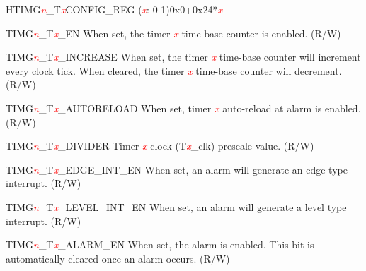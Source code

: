 \begin{register}{H}{TIMG\textcolor{red}{\it{n}}\_T\textcolor{red}{\it{x}}CONFIG\_REG (\textcolor{red}{\it{x}}: 0-1)}{0x0+0x24*\textcolor{red}{\it{x}}}\label{regdesc:TIMERSTnCONFIGREG}
%
%
%
%
%
%
%
%
\regnewline%
\begin{regdesc}\begin{reglist}
\item [TIMG\textcolor{red}{\it{n}}\_T\textcolor{red}{\it{x}}\_EN]When set, the timer \textcolor{red}{\it{x}} time-base counter is enabled. (R/W)
\item [TIMG\textcolor{red}{\it{n}}\_T\textcolor{red}{\it{x}}\_INCREASE]When set, the timer \textcolor{red}{\it{x}} time-base counter will increment every clock tick. When cleared, the timer \textcolor{red}{\it{x}} time-base counter will decrement. (R/W)
\item [TIMG\textcolor{red}{\it{n}}\_T\textcolor{red}{\it{x}}\_AUTORELOAD]When set, timer \textcolor{red}{\it{x}} auto-reload at alarm is enabled. (R/W)
\item [TIMG\textcolor{red}{\it{n}}\_T\textcolor{red}{\it{x}}\_DIVIDER]Timer \textcolor{red}{\it{x}} clock (T\textcolor{red}{\it{x}}\_clk) prescale value.  (R/W)
\item [TIMG\textcolor{red}{\it{n}}\_T\textcolor{red}{\it{x}}\_EDGE\_INT\_EN]When set, an alarm will generate an edge type interrupt. (R/W)
\item [TIMG\textcolor{red}{\it{n}}\_T\textcolor{red}{\it{x}}\_LEVEL\_INT\_EN]When set, an alarm will generate a level type interrupt. (R/W)
\item [TIMG\textcolor{red}{\it{n}}\_T\textcolor{red}{\it{x}}\_ALARM\_EN]\label{TIMGnTxALARMEN}When set, the alarm is enabled. This bit is automatically cleared once an alarm occurs. (R/W)
\end{reglist}\end{regdesc}
\end{register}


